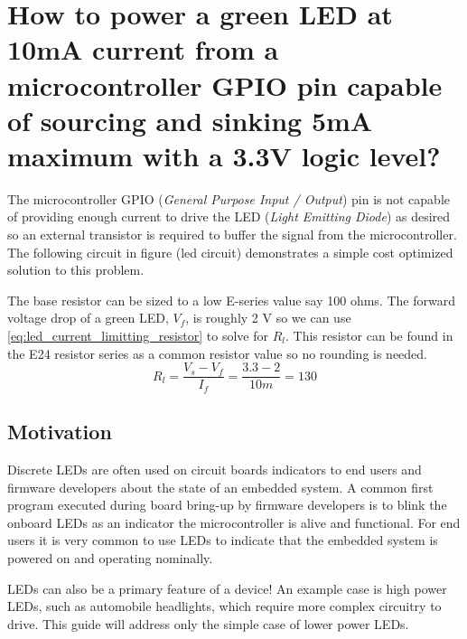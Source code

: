 \documentclass[main.tex]{subfiles}
\begin{document}
\section{How to power a green LED at 10mA current from a microcontroller GPIO pin capable of sourcing and sinking 5mA maximum with a 3.3V logic level?}

\noindent The microcontroller GPIO (\textit{General Purpose Input / Output}) pin is not capable of providing enough current to drive the LED (\textit{Light Emitting Diode}) as desired so an external transistor is required to buffer the signal from the microcontroller. The following circuit in figure (led circuit) demonstrates a simple cost optimized solution to this problem. 


The base resistor can be sized to a low E-series value say 100 ohms. The forward voltage drop of a green LED, $V_f$, is roughly 2 V so we can use \eqref{eq:led_current_limitting_resistor} to solve for $R_l$. This resistor can be found in the E24 resistor series as a common resistor value so no rounding is needed. 
\begin{equation}
    R_l = \frac{V_s - V_f}{I_f} = \frac{3.3-2}{10m} =  130 
    \label{eq:led_current_limitting_resistor}
\end{equation}

\subsection{Motivation}
Discrete LEDs are often used on circuit boards indicators to end users and firmware developers about the state of an embedded system. A common first program executed during board bring-up by firmware developers is to blink the onboard LEDs as an indicator the microcontroller is alive and functional. For end users it is very common to use LEDs to indicate that the embedded system is powered on and operating nominally. 

LEDs can also be a primary feature of a device! An example case is high power LEDs, such as automobile headlights, which require more complex circuitry to drive. This guide will address only the simple case of lower power LEDs. 
\end{document}
